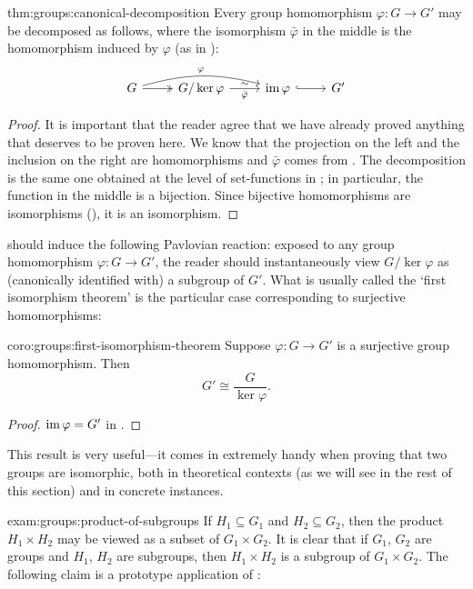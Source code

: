 \begin{thm}{}{thm:groups:canonical-decomposition}
  Every group homomorphism $\varphi : G \to G'$ may be
    decomposed as follows, where the isomorphism $\bar\varphi$ in the
    middle is the homomorphism induced by $\varphi$ (as in
    ):
  \[
    \begin{tikzcd}
      G \arrow[rr, "\varphi", bend left=15] \arrow[r, two heads] &
      G/\ker\varphi \arrow[r, "\bar\varphi"', "\sim"] & \image\varphi
      \arrow[r, hook] & G'
    \end{tikzcd}
  \]
\end{thm}
\begin{proof}
  It is important that the reader agree that we have already proved
  anything that deserves to be proven here. We know that the
  projection on the left and the inclusion on the right are
  homomorphisms and $\bar\varphi$ comes from
  .  The
  decomposition is the same one obtained at the level of set-functions
  in ; in particular,
  the function in the middle is a bijection. Since bijective
  homomorphisms are isomorphisms
  (), it is an isomorphism.
\end{proof}

 should induce the
following Pavlovian reaction: exposed to any group homomorphism
$\varphi : G \to G'$, the reader should instantaneously view
$G/\ker\varphi$ as (canonically identified with) a subgroup of $G'$.
What is usually called the `first isomorphism theorem' is the
particular case corresponding to surjective homomorphisms:

\begin{coro}{}{coro:groups:first-isomorphism-theorem}
  Suppose $\varphi : G \to G'$ is a surjective group
homomorphism. Then
\[
  G' \cong \frac{G}{\ker\varphi}.
\]
\end{coro}
\begin{proof}
  $\operatorname{im}\varphi = G'$ in
  .
\end{proof}

This result is very useful---it comes in extremely handy when proving
that two groups are isomorphic, both in theoretical contexts (as we
will see in the rest of this section) and in concrete instances.

\begin{exam}{}{exam:groups:product-of-subgroups}
  If $H_1 \subseteq G_1$ and $H_2 \subseteq G_2$, then the product
  $H_1 \times H_2$ may be viewed as a subset of $G_1 \times G_2$. It
  is clear that if $G_1$, $G_2$ are groups and $H_1$, $H_2$ are
  subgroups, then $H_1 \times H_2$ is a subgroup of $G_1 \times
  G_2$. The following claim is a prototype application of
  :
\end{exam}

